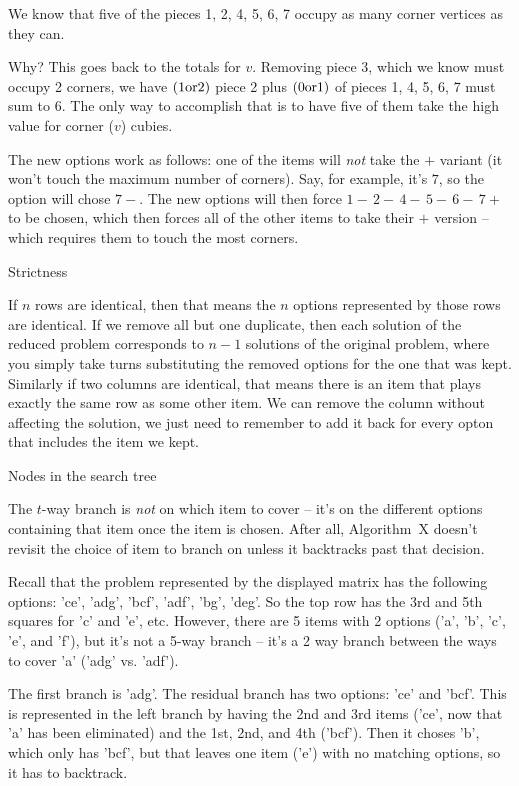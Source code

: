  We know that five of the pieces 1, 2, 4, 5, 6, 7 occupy as
many corner vertices as they can.
\vskip 0.1in

\noindent Why?  This goes back to the totals for $v$.  Removing piece 3,
which we know must occupy 2 corners, we have $\left(1 {\rm or} 2\right)$ piece 2 
plus $\left(0 {\rm or} 1\right)$ of pieces 1, 4, 5, 6, 7 must sum to 6.
The only way to accomplish that is to have five of them take the high value
for corner ($v$) cubies.

The new options work as follows: one of the items will {\it not} take the $+$
variant (it won't touch the maximum number of corners).  Say, for example,
it's $7$, so the option will chose $7-$.  The new options will then force
$1-\,2-\,4-\,5-\,6-\,7+$ to be chosen, which then forces all of the other
items to take their $+$ version -- which requires them to touch the most
corners.


 Strictness

If $n$ rows are identical, then that means the $n$ options represented by those
rows are identical.  If we remove all but one duplicate, then each solution of
the reduced problem corresponds to $n-1$ solutions of the original problem,
where you simply take turns substituting the removed options for the one that
was kept.  Similarly if two columns are identical, that means there is an item
that plays exactly the same row as some other item.  We can remove the column
without affecting the solution, we just need to remember to add it back for
every opton that includes the item we kept.

 Nodes in the search tree

The $t$-way branch is {\it not} on which item to cover -- it's on the different
options containing that item once the item is chosen.  After all, Algorithm~X
doesn't revisit the choice of item to branch on unless it backtracks past that
decision.

Recall that the problem represented by the displayed matrix has the following
options: 'ce', 'adg', 'bcf', 'adf', 'bg', 'deg'.  So the top row has the
3rd and 5th squares for 'c' and 'e', etc.  However, there are 5 items with
2 options ('a', 'b', 'c', 'e', and 'f'), but it's not a 5-way branch -- it's 
a 2 way branch between the ways to cover 'a' ('adg' vs. 'adf').

The first branch is 'adg'.  The residual branch has two options: 'ce' and
'bcf'.  This is represented in the left branch by having the 2nd and 3rd
items ('ce', now that 'a' has been eliminated) and the 1st, 2nd, and 4th
('bcf').  Then it choses 'b', which only has 'bcf', but that leaves one
item ('e') with no matching options, so it has to backtrack.

